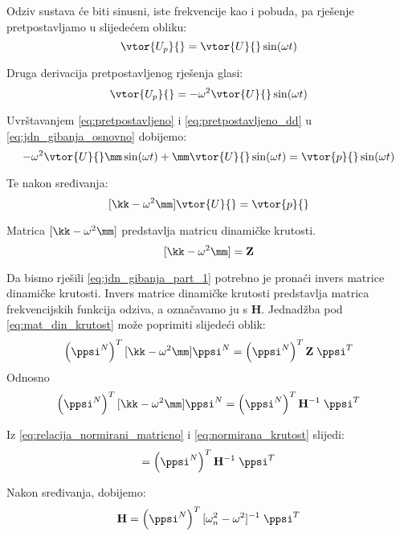 Odziv sustava će biti sinusni, iste frekvencije kao i pobuda, pa rješenje
pretpostavljamo u slijedećem obliku:
\begin{equation}\label{eq:pretpostavljeno}
    \vtor{U_p}{}=\vtor{U}{}\sin(\omega t)
\end{equation}

Druga derivacija pretpostavljenog rješenja glasi:
\begin{equation}\label{eq:pretpostavljeno_dd}
    \vtor{U_p}{}=-\omega^2\vtor{U}{}\sin(\omega t)
\end{equation}

Uvrštavanjem \eqref{eq:pretpostavljeno} i \eqref{eq:pretpostavljeno_dd} u
\eqref{eq:jdn_gibanja_osnovno} dobijemo:
\begin{equation}
    -\omega^2\vtor{U}{}\mm\sin(\omega t) + \mm\vtor{U}{}\sin(\omega t) = \vtor{p}{}\sin(\omega t)
\end{equation}

Te nakon sređivanja:
\begin{equation}\label{eq:jdn_gibanja_part_1}
    [\kk-\omega^2\mm]\vtor{U}{}=\vtor{p}{}
\end{equation}

Matrica $[\kk-\omega^2\mm]$ predstavlja matricu dinamičke krutosti.
\begin{equation}\label{eq:mat_din_krutost}
    [\kk-\omega^2\mm]=\mathbf{Z}
\end{equation}

Da bismo rješili \eqref{eq:jdn_gibanja_part_1} potrebno je pronaći invers matrice
dinamičke krutosti. Invers matrice dinamičke krutosti predstavlja matrica
frekvencijskih funkcija odziva, a označavamo ju s $\mathbf{H}$. Jednadžba pod 
\eqref{eq:mat_din_krutost} može poprimiti slijedeći oblik:
\begin{equation}
    \left(\ppsi^N\right)^T[\kk-\omega^2\mm]\ppsi^N
    =
    \left(\ppsi^N\right)^T\mathbf{Z}\;\ppsi^T
\end{equation}
Odnosno
\begin{equation}
     \left(\ppsi^N\right)^T[\kk-\omega^2\mm]\ppsi^N
    =
    \left(\ppsi^N\right)^T\mathbf{H}^{-1}\;\ppsi^T
\end{equation}

Iz \eqref{eq:relacija_normirani_matricno} i \eqref{eq:normirana_krutost} slijedi:
\begin{equation}
    [\omega_n^2 - \omega^2] = \left(\ppsi^N\right)^T\mathbf{H}^{-1}\;\ppsi^T
\end{equation}

Nakon sređivanja, dobijemo:
\begin{equation}
    \mathbf{H}=\left(\ppsi^N\right)^T[\omega_n^2 - \omega^2]^{-1}\;\ppsi^T
\end{equation}

